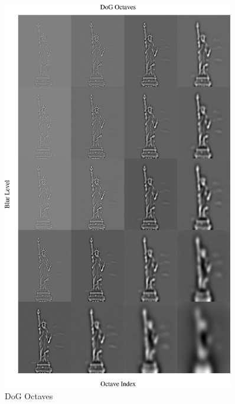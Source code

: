 \documentclass[11pt,a4paper]{article}
\begin{document}
\begin{figure}[ht!]
\begin{minipage}{0.45\textwidth}
    \includegraphics[width=0.9\textwidth]{figs/dog_octaves.png} %
    \caption{DoG Octaves}
  \end{minipage}
\end{figure}

\newpage
\end{document}
